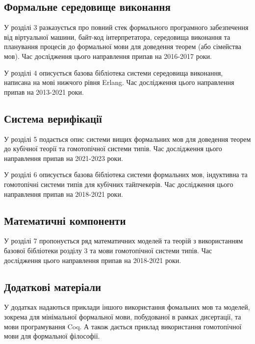 \subsection*{Формальне середовище виконання}
У розділі 3 разказується про повний стек формального програмного забезпечення
від віртуальної машини, байт-код інтерпретатора, середовища виконання
та планування процесів до формальної мови для доведення теорем (або сімейства мов).
Час дослідження цього направлення припав на 2016-2017 роки.

У розділі 4 описується базова бібліотека системи середовища виконання,
написана на мові нижчого рівня Erlang.
Час дослідження цього направлення припав на 2013-2021 роки.

\subsection*{Система верифікації}
У розділі 5 подається опис системи вищих формальних мов для доведення теорем до
кубічної теорії та гомотопічної системи типів.
Час дослідження цього направлення припав на 2021-2023 роки.

У розділі 6 описується базова бібліотека системи формальних мов, індуктивна
та гомотопічні системи типів для кубічних тайпчекерів.
Час дослідження цього направлення припав на 2018-2021 роки.

\subsection*{Математичні компоненти}
У розділі 7 пропонується ряд математичних моделей та теорій з використанням
базової бібліотеки розділу 3 та мови гомотопічної системи типів.
Час дослідження цього направлення припав на 2018-2021 роки.

\subsection*{Додаткові матеріали}
У додатках надаються приклади іншого використання фомальних мов та моделей,
зокрема для мінімальної формальної мови, побудованої в рамках дисертації,
та мови програмування Coq. А також дається приклад використання
гомотопічної мови для формальної філософії.
